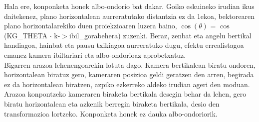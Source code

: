 \documentclass[12pt]{article}
\begin{document}
Hala ere, konponketa honek albo-ondorio bat dakar. Goiko eskuineko irudian ikus daitekenez, plano horizontalean aurreratutako distantzia ez da 1ekoa, bektorearen plano horizontalarekiko duen proiekzioaren luzera baino, $\cos(\theta)$ = $\cos$(KG\_THETA $\cdot$ k-$>$ibil\_gorabehera) zuzenki. Beraz, zenbat eta angelu bertikal handiagoa, hainbat eta pausu txikiagoa aurreratuko dugu, efektu errealistagoa emanez kamera ibiltariari eta albo-ondorioaz aprobetxatuz.\\

Bigarren arazoa lehenengoarekin lotuta dago. Kamera bertikalean biratu ondoren, horizontalean biratuz gero, kameraren posizioa geldi geratzen den arren, begirada ez da horizontalean biratzen, azpiko ezkerreko aldeko irudian ageri den moduan. Arazoa konpontzeko kameraren biraketa bertikala desegin behar da lehen, gero biratu horizontalean eta azkenik berregin biraketa bertikala, desio den transformazioa lortzeko. Konponketa honek ez dauka albo-ondoriorik.
\end{document}
